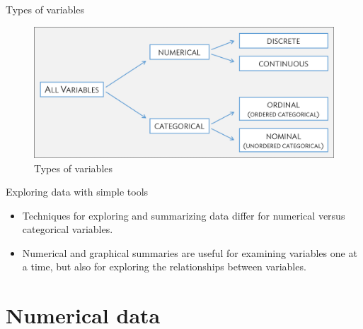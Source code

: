 \documentclass[10pt]{beamer}\usepackage[]{graphicx}\usepackage[]{color}
\begin{document}
\begin{frame}{Types of variables}
	\protect\hypertarget{types-of-variables-1}{}
	
	\begin{figure}
		\centering
		\includegraphics[scale=0.5]{figures/variableTypes.png}
		\caption{Types of variables}
	\end{figure}
	
\end{frame}



\begin{frame}{Exploring data with simple tools}
	\protect\hypertarget{exploring-data-with-simple-tools}{}
	
	\begin{itemize}
		\item Techniques for exploring and summarizing data differ for numerical
	versus categorical variables.
	
	\item Numerical and graphical summaries are useful for examining variables one
	at a time, but also for exploring the relationships between variables.
	\end{itemize}
	
\end{frame}


\section{Numerical data}\label{sec:numerical-data}
\end{document}
